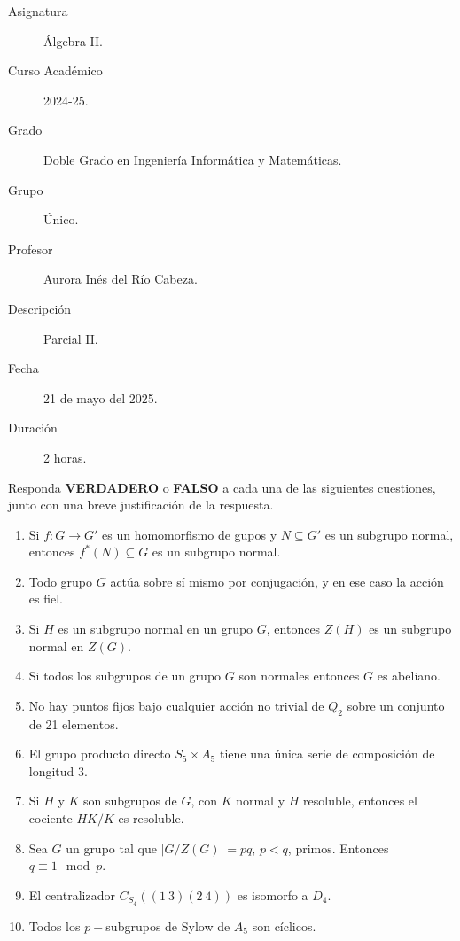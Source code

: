 \documentclass[12pt]{article}
\begin{document}

    
    

    \begin{description}
        \item[Asignatura] Álgebra II.
        \item[Curso Académico] 2024-25.
        \item[Grado] Doble Grado en Ingeniería Informática y Matemáticas.
        \item[Grupo] Único.
        \item[Profesor] Aurora Inés del Río Cabeza.
        \item[Descripción] Parcial II.
        \item[Fecha] 21 de mayo del 2025.
        \item[Duración] 2 horas.
    
    \end{description}
    \newpage

    \begin{ejercicio}[5 puntos]
        Responda \textbf{VERDADERO} o \textbf{FALSO} a cada una de las siguientes cuestiones, junto con una breve justificación de la respuesta.
        \begin{enumerate}
            \item Si $f:G\to G'$ es un homomorfismo de gupos y $N\subseteq G'$ es un subgrupo normal, entonces $f^\ast(N)\subseteq G$ es un subgrupo normal.
            \item Todo grupo $G$ actúa sobre sí mismo por conjugación, y en ese caso la acción es fiel.
            \item Si $H$ es un subgrupo normal en un grupo $G$, entonces $Z(H)$ es un subgrupo normal en $Z(G)$.
            \item Si todos los subgrupos de un grupo $G$ son normales entonces $G$ es abeliano.
            \item No hay puntos fijos bajo cualquier acción no trivial de $Q_2$ sobre un conjunto de 21 elementos.
            \item El grupo producto directo $S_5\times A_5$ tiene una única serie de composición de longitud 3.
            \item Si $H$ y $K$ son subgrupos de $G$, con $K$ normal y $H$ resoluble, entonces el cociente $HK/K$ es resoluble.
            \item Sea $G$ un grupo tal que $|G/Z(G)| = pq$, $p<q$, primos. Entonces $q\equiv 1 \mod p$.
            \item El centralizador $C_{S_4}((1\ 3)(2\ 4))$ es isomorfo a $D_4$.
            \item Todos los $p-$subgrupos de Sylow de $A_5$ son cíclicos.
        \end{enumerate}
    \end{ejercicio}
\end{document}
